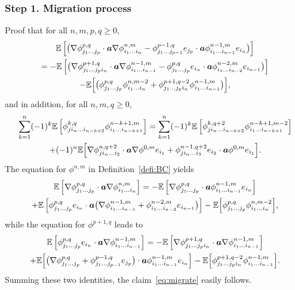 \documentclass[JEP,XML,SOM,Unicode,published]{cedram}
\theoremstyle{plain}
\theoremstyle{definition}
\numberwithin{equation}{section}
\newcommand{\ee}{e}
\newcommand{\Aa}{\boldsymbol a}
\newcommand{\step}[1]{\subsubsection*{Step \textup #1}}
\newcommand{\expec}[1]{\mathbb{E}\left[ #1 \right]}
\newcommand{\Bexpec}[1]{\mathbb{E}\Bigl[ #1 \Bigr]}
\begin{document}
\step{1. Migration process} Proof that for all $n,m,p,q\ge0$,
\begin{multline}\label{eq:migrate}
\expec{\big(\nabla\phi^{p,q}_{j_1\ldots j_p}\cdot\Aa\nabla\phi^{n,m}_{i_1\ldots i_n}-\phi^{p-1,q}_{j_1\ldots j_{p-1}}\ee_{j_p}\cdot\Aa\phi^{n-1,m}_{i_1\ldots i_{n-1}}\ee_{i_n}\big)}\\
=-\expec{\big(\nabla\phi^{p+1,q}_{j_1\ldots j_{p}i_n}\cdot\Aa\nabla\phi^{n-1,m}_{i_1\ldots i_{n-1}}-\phi^{p,q}_{j_1\ldots j_{p}}\ee_{i_n}\cdot\Aa\phi^{n-2,m}_{i_1\ldots i_{n-2}}\ee_{i_{n-1}}\big)}\\
-\Bexpec{\big(\phi^{p,q}_{j_1\ldots j_p}\phi^{n,m-2}_{i_1\ldots i_n}+\phi^{p+1,q-2}_{j_1\ldots j_pi_n}\phi^{n-1,m}_{i_1\ldots i_{n-1}}\big)},
\end{multline}
and in addition, for all $n,m,q\ge0$,
\begin{multline}\label{eq:migrate-re}
\sum_{k=1}^n(-1)^k\expec{\phi^{k,q}_{ji_n\ldots i_{n-k+2}}\phi^{n-k+1,m}_{i_1\ldots i_{n-k+1}}}=\sum_{k=1}^{n}(-1)^k\expec{\phi^{k,q+2}_{ji_n\ldots i_{n-k+2}}\phi^{n-k+1,m-2}_{i_1\ldots i_{n-k+1}}}\\
+(-1)^n\Bexpec{\nabla\phi^{n,q+2}_{ji_n\ldots i_{2}}\cdot\Aa\nabla\phi^{0,m}\ee_{i_1}+\phi^{n-1,q+2}_{ji_n\ldots i_{3}}\ee_{i_{2}}\cdot\Aa\phi^{0,m}\ee_{i_{1}}}.
\end{multline}
The equation for $\phi^{n,m}$ in Definition~\ref{defi:BC} yields
\begin{multline*}
\expec{\nabla\phi^{p,q}_{j_1\ldots j_{p}}\cdot\Aa\nabla\phi^{n,m}_{i_1\ldots i_n}}=-\expec{\nabla\phi^{p,q}_{j_1\ldots j_{p}}\cdot\Aa\phi^{n-1,m}_{i_1\ldots i_{n-1}}\ee_{i_n}}\\
+\expec{\phi^{p,q}_{j_1\ldots j_{p}}\ee_{i_n}\cdot\Aa\big(\nabla\phi^{n-1,m}_{i_1\ldots i_{n-1}}+\phi^{n-2,m}_{i_1\ldots i_{n-2}}\ee_{i_{n-1}}\big)}
-\Bexpec{\phi^{p,q}_{j_1\ldots j_{p}}\phi^{n,m-2}_{i_1\ldots i_n}},
\end{multline*}
while the equation for $\phi^{{p+1},q}$ leads to
\begin{multline*}
\expec{\phi^{p,q}_{j_1\ldots j_p}\ee_{i_n}\cdot\Aa\nabla\phi^{n-1,m}_{i_1\ldots i_{n-1}}}=-\expec{\nabla\phi^{p+1,q}_{j_1\ldots j_pi_n}\cdot\Aa\nabla\phi^{n-1,m}_{i_1\ldots i_{n-1}}}\\
+\Bexpec{\big(\nabla\phi^{p,q}_{j_1\ldots j_p}+\phi^{p-1,q}_{j_1\ldots j_{p-1}}\ee_{j_p}\big)\cdot\Aa\phi^{n-1,m}_{i_1\ldots i_{n-1}}\ee_{i_n}}
-\Bexpec{\phi^{p+1,q-2}_{j_1\ldots j_pi_n}\phi^{n-1,m}_{i_1\ldots i_{n-1}}}.
\end{multline*}
Summing these two identities, the claim~\eqref{eq:migrate} easily follows.
\end{document}
